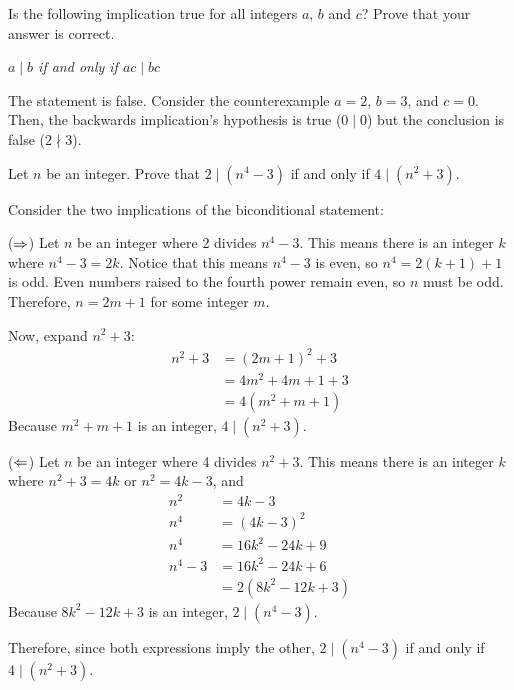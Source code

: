 \begin{recommended}
  Is the following implication true for all integers $a$, $b$ and $c$? Prove that your answer is correct.
  \begin{center}
    \emph{$a \mid b$ if and only if $ac \mid bc$}
  \end{center}
\end{recommended}
\begin{sol}
  The statement is false.
  Consider the counterexample $a=2$, $b=3$, and $c=0$.
  Then, the backwards implication's hypothesis is true ($0 \mid 0$) but the conclusion is false ($2 \nmid 3$).
\end{sol}


\begin{recommended}
  Let $n$ be an integer. Prove that $2 \mid (n^4 - 3)$ if and only if $4 \mid (n^2 + 3)$.
\end{recommended}
\begin{prf}
  Consider the two implications of the biconditional statement:

  ($\Rightarrow$) Let $n$ be an integer where 2 divides $n^4 - 3$.
  This means there is an integer $k$ where $n^4-3 = 2k$.
  Notice that this means $n^4-3$ is even, so $n^4=2(k+1)+1$ is odd.
  Even numbers raised to the fourth power remain even, so $n$ must be odd.
  Therefore, $n = 2m+1$ for some integer $m$.

  Now, expand $n^2+3$:
  \begin{align*}
    n^2 + 3 & = (2m+1)^2 + 3      \\
            & = 4m^2 + 4m + 1 + 3 \\
            & = 4(m^2 + m + 1)
  \end{align*}
  Because $m^2 + m + 1$ is an integer, $4 \mid (n^2 + 3)$.

  ($\Leftarrow$) Let $n$ be an integer where 4 divides $n^2 + 3$.
  This means there is an integer $k$ where $n^2 + 3 = 4k$ or $n^2 = 4k-3$, and
  \begin{align*}
    n^2     & = 4k-3              \\
    n^4     & = (4k-3)^2          \\
    n^4     & = 16k^2 - 24k + 9   \\
    n^4 - 3 & = 16k^2 - 24k + 6   \\
            & = 2(8k^2 - 12k + 3)
  \end{align*}
  Because $8k^2 - 12k + 3$ is an integer, $2 \mid (n^4 - 3)$.

  Therefore, since both expressions imply the other, $2 \mid (n^4 - 3)$ if and only if $4 \mid (n^2 + 3)$.
\end{prf}


